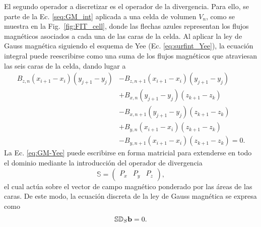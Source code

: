 El segundo operador a discretizar es el operador de la divergencia. Para ello, se parte de la Ec. \eqref{seq:GM_int} aplicada a una celda de volumen $V_n$, como se muestra en la Fig.~\ref{fig:FIT_cell}, donde las flechas azules representan los flujos magnéticos asociados a cada una de las caras de la celda. Al aplicar la ley de Gauss magnética siguiendo el esquema de Yee (Ec. \ref{eq:surfint_Yee}), la ecuación integral puede reescribirse como una suma de los flujos magnéticos que atraviesan las seis caras de la celda, dando lugar a~\cite{hadabSolutionMaxwellsEquation2023}
%
\begin{align}
	B_{z,n}(x_{i+1}-x_i)(y_{j+1}-y_j)
	&-B_{z,n+1}(x_{i+1}-x_i)(y_{j+1}-y_j)\nonumber\\
	&+B_{x,n}(y_{j+1}-y_j)(z_{k+1}-z_k)\nonumber\\
	&-B_{x,n+1}(y_{j+1}-y_j)(z_{k+1}-z_k)\nonumber\\
	&+B_{y,n}(x_{i+1}-x_i)(z_{k+1}-z_k)\nonumber\\
	&-B_{y,n+1}(x_{i+1}-x_i)(z_{k+1}-z_k)=0.
	\label{eq:GM-Yee}
\end{align}
%
La Ec. \eqref{eq:GM-Yee} puede escribirse en forma matricial para extenderse en todo el dominio mediante la introducción del operador de divergencia \cite{hadabSolutionMaxwellsEquation2023}
%
\begin{equation}
	\mathbb{S} = \begin{pmatrix} P_x & P_y & P_z \end{pmatrix},
\end{equation}
%
el cual actúa sobre el vector de campo magnético ponderado por las áreas de las caras. De este modo, la ecuación discreta de la ley de Gauss magnética se expresa como \cite{hadabSolutionMaxwellsEquation2023}
%
\begin{equation}
	\mathbb{S}\mathbb{D}_S\vb{b} = 0.
\end{equation}

